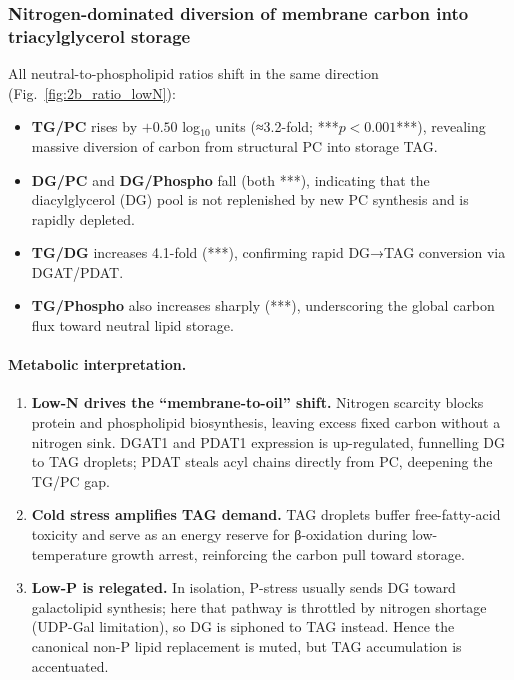 \documentclass[10pt,letterpaper]{article}
\begin{document}

\subsubsection*{Nitrogen-dominated diversion of membrane carbon into triacylglycerol storage}

All neutral-to-phospholipid ratios shift in the same direction
(Fig.~\ref{fig:2b_ratio_lowN}):

\begin{itemize}
  \item \textbf{TG/PC} rises by \(+0.50\) log\(_{10}\) units
        (≈3.2-fold; ***$p<0.001$***),
        revealing massive diversion of carbon from structural PC into
        storage TAG.
  \item \textbf{DG/PC} and \textbf{DG/Phospho} fall (both ***),
        indicating that the diacylglycerol (DG) pool is not replenished by
        new PC synthesis and is rapidly depleted.
  \item \textbf{TG/DG} increases 4.1-fold (***),
        confirming rapid DG→TAG conversion via DGAT/PDAT.
  \item \textbf{TG/Phospho} also increases sharply (***),
        underscoring the global carbon flux toward neutral lipid storage.
\end{itemize}

\paragraph{Metabolic interpretation.}
\begin{enumerate}
  \item \textbf{Low-N drives the “membrane-to-oil” shift.}\;
        Nitrogen scarcity blocks protein and phospholipid biosynthesis,
        leaving excess fixed carbon without a nitrogen sink.
        DGAT1 and PDAT1 expression is up-regulated, funnelling DG to TAG
        droplets; PDAT steals acyl chains directly from PC, deepening the
        TG/PC gap.
  \item \textbf{Cold stress amplifies TAG demand.}\;
        TAG droplets buffer free-fatty-acid toxicity and serve as an
        energy reserve for β-oxidation during low-temperature growth
        arrest, reinforcing the carbon pull toward storage.
  \item \textbf{Low-P is relegated.}\;
        In isolation, P-stress usually sends DG toward
        galactolipid synthesis; here that pathway is throttled by
        nitrogen shortage (UDP-Gal limitation), so DG is siphoned to TAG
        instead.  Hence the canonical non-P lipid replacement is muted,
        but TAG accumulation is accentuated.
\end{enumerate}
\end{document}
